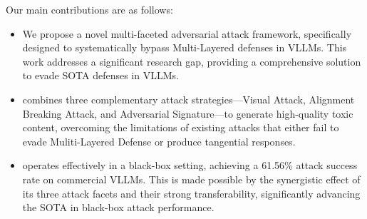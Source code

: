 Our main contributions are as follows: 
\begin{itemize}[leftmargin=*, itemsep=1pt]
\vspace{-5pt}
\item We propose a novel multi-faceted adversarial attack framework, specifically designed to systematically bypass Multi-Layered defenses in VLLMs. This work addresses a significant research gap, providing a comprehensive solution to evade SOTA defenses in VLLMs.

\item \mfa combines three complementary attack strategies—Visual Attack, Alignment Breaking Attack, and Adversarial Signature—to generate high-quality toxic content, overcoming the limitations of existing attacks that either fail to evade Muliti-Layered Defense or produce tangential responses. 

\item \mfa operates effectively in a black-box setting, achieving a 61.56\% attack success rate on commercial VLLMs. This is made possible by the synergistic effect of its three attack facets and their strong transferability, significantly advancing the SOTA in black-box attack performance.
\vspace{-5pt}

\end{itemize}



























